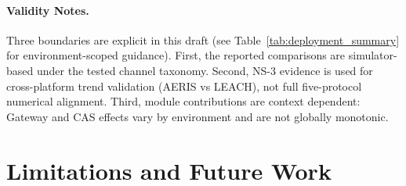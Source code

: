 ﻿\documentclass[sensors,article,submit,moreauthors,pdftex]{Definitions/mdpi}
\begin{document}
\paragraph{Validity Notes.}
Three boundaries are explicit in this draft (see Table~\ref{tab:deployment_summary} for environment-scoped guidance). First, the reported comparisons are simulator-based under the tested channel taxonomy. Second, NS-3 evidence is used for cross-platform trend validation (AERIS vs LEACH), not full five-protocol numerical alignment. Third, module contributions are context dependent: Gateway and CAS effects vary by environment and are not globally monotonic.

\section{Limitations and Future Work}
\end{document}
